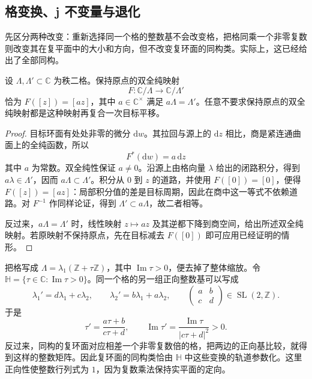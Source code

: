 \subsection{格变换、j 不变量与退化}
\label{g4:subsec:0405:04}

先区分两种改变：重新选择同一个格的整数基不会改变格，把格同乘一个非零复数则改变其在复平面中的大小和方向，但不改变复环面的同构类。实际上，这已经给出了全部同构。

\begin{proposition}\label{g4:prop:0405:lattice-isomorphism}
	设 \(\Lambda,\Lambda'\subset\mathbb C\) 为秩二格。保持原点的双全纯映射
	\[
		F:\mathbb C/\Lambda\longrightarrow\mathbb C/\Lambda'
	\]
	恰为 \(F([z])=[az]\)，其中 \(a\in\mathbb C^\times\) 满足 \(a\Lambda=\Lambda'\)。任意不要求保持原点的双全纯映射都是这种映射再复合一次目标平移。
\end{proposition}
\begin{proof}
	目标环面有处处非零的微分 \(\mathrm{d}w\)。其拉回与源上的 \(\mathrm{d}z\) 相比，商是紧连通曲面上的全纯函数，所以
	\[
		F^*(\mathrm{d}w)=a\,\mathrm{d}z
	\]
	其中 \(a\) 为常数。双全纯性保证 \(a\ne0\)。沿源上由格向量 \(\lambda\) 给出的闭路积分，得到 \(a\lambda\in\Lambda'\)，因而 \(a\Lambda\subset\Lambda'\)。积分从 \(0\) 到 \(z\) 的道路，并使用 \(F([0])=[0]\)，便得 \(F([z])=[az]\)：局部积分值的差是目标周期，因此在商中这一等式不依赖道路。对 \(F^{-1}\) 作同样论证，得到 \(\Lambda'\subset a\Lambda\)，故二者相等。

	反过来，\(a\Lambda=\Lambda'\) 时，线性映射 \(z\mapsto az\) 及其逆都下降到商空间，给出所述双全纯映射。若原映射不保持原点，先在目标减去 \(F([0])\) 即可应用已经证明的情形。
\end{proof}

把格写成 \(\Lambda=\lambda_1(\mathbb Z+\tau\mathbb Z)\)，其中 \(\operatorname{Im}\tau>0\)，便去掉了整体缩放。令 \(\mathbb H=\{\tau\in\mathbb C:\operatorname{Im}\tau>0\}\)。同一个格的另一组正向整数基可以写成
\[
	\lambda_1'=d\lambda_1+c\lambda_2,\qquad
	\lambda_2'=b\lambda_1+a\lambda_2,\qquad
	\begin{pmatrix}a&b\\c&d\end{pmatrix}\in\operatorname{SL}(2,\mathbb Z).
\]
于是
\begin{equation}\label{g4:eq:0405:modular-action}
	\tau'=\frac{a\tau+b}{c\tau+d},\qquad
	\operatorname{Im}\tau'=\frac{\operatorname{Im}\tau}{|c\tau+d|^2}>0.
\end{equation}
反过来，同构的复环面对应相差一个非零复数倍的格，把两边的正向基比较，就得到这样的整数矩阵。因此复环面的同构类恰由 \(\mathbb H\) 中这些变换的轨道参数化。这里正向性使整数行列式为 \(1\)，因为复数乘法保持实平面的定向。

